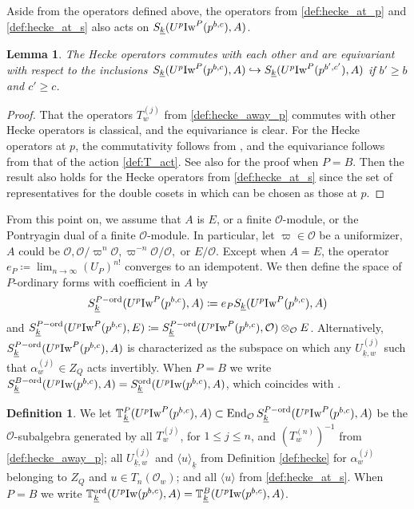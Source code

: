 \documentclass[leqno]{amsart}
\newtheorem{lem}[thm]{Lemma}
\theoremstyle{definition}
\newtheorem{defn}[thm]{Definition}
\theoremstyle{remark}
\newcommand{\oo}{\mathcal{O}}
\DeclareMathOperator{\End}{End}
\newcommand{\wt}[1]{\underline{ #1 }}
\newcommand{\Iw}{\textnormal{Iw}} %
\newcommand{\TT}{\mathbb{T}} %
\newcommand{\ord}{\textnormal{ord}} %
\begin{document}
Aside from the operators defined above,
the operators from \eqref{def:hecke_at_p} and
\eqref{def:hecke_at_s} also 
acts on $S_{\wt{k}}(U^p\Iw^P(p^{b,c}),A)$.

\begin{lem}
The Hecke operators commutes with each other
and are equivariant with respect to the inclusions
$ S_{\wt{k}}(U^p\Iw^P(p^{b,c}),A)\hookrightarrow
S_{\wt{k}}(U^p\Iw^P(p^{b',c'}),A)$
if $b'\geq b$ and $c'\geq c$.
\end{lem}
\begin{proof}
That the operators $T_w^{(j)}$ from \eqref{def:hecke_away_p}
commutes with other Hecke operators is classical,
and the equivariance is clear.
For the Hecke operators at $p$,
the commutativity follows from \cite[Lem 3.1.4]{emeI},
and the equivariance follows from 
that of the action \eqref{def:T_act}.
See also \cite[Lem 2.10]{ger} for the proof when $P=B$.
Then the result also holds for the Hecke operators from 
\eqref{def:hecke_at_s}
since the set of representatives for the double cosets
in which can be chosen as those at $p$.
\end{proof}

From this point on,
we assume that $A$ is $E$, or a finite $\oo$-module,
or the Pontryagin dual of a finite $\oo$-module.
In particular, let $\varpi\in \oo$ be a uniformizer, $A$ could be 
$\oo, \oo/\varpi^n\oo, \varpi^{-n}\oo/\oo,$ or $E/\oo$.
Except when $A=E$,
the operator $e_P\coloneqq\lim_{n\to \infty}(U_P)^{n!}$
converges to an idempotent.
We then define the space of $P$-ordinary forms 
with coefficient in $A$ by
\[
	S_{\wt{k}}^{P-\ord}(U^p\Iw^P(p^{b,c}),A)\coloneqq
	e_PS_{\wt{k}}(U^p\Iw^P(p^{b,c}),A)
\]
and $S_{\wt{k}}^{P-\ord}(U^p\Iw^P(p^{b,c}),E)\coloneqq 
S_{\wt{k}}^{P-\ord}(U^p\Iw^P(p^{b,c}),\oo)\otimes_{\oo}E$.
Alternatively,
$S_{\wt{k}}^{P-\ord}(U^p\Iw^P(p^{b,c}),A)$
is characterized as the subspace on which 
any  $U_{\wt{k},w}^{(j)}$ such that 
$\alpha_w^{(j)}\in Z_Q$ acts invertibly.
When $P=B$ we write 
$S_{\wt{k}}^{B-\ord}(U^p\Iw(p^{b,c}),A)=
S_{\wt{k}}^{\ord}(U^p\Iw(p^{b,c}),A)$,
which coincides with \cite[Def 2.13]{ger}.

\begin{defn}\label{def:ord_hecke}
	We let $\TT^P_{\wt{k}}(U^p\Iw^P(p^{b,c}),A)\subset 
    \End_{\oo}S_{\wt{k}}^{P-\ord}(U^p\Iw^P(p^{b,c}),A)$
	be the $\oo$-subalgebra
	generated by all
	$T_w^{(j)}$, for $1\leq j\leq n$,
	and $(T_w^{(n)})^{-1}$ from \eqref{def:hecke_away_p};
	all $U_{\wt{k},w}^{(j)}$ and $\langle u\rangle_{\wt{k}}$
    from Definition \ref{def:hecke}
	for $\alpha_w^{(j)}$ belonging to $Z_Q$ and $u\in T_n(\oo_w)$;
    and all $\langle u\rangle$ from \eqref{def:hecke_at_s}.
    When $P=B$
    we write $\TT^{\ord}_{\wt{k}}(U^p\Iw(p^{b,c}),A)=
    \TT^B_{\wt{k}}(U^p\Iw(p^{b,c}),A)$.
\end{defn}
\end{document}
